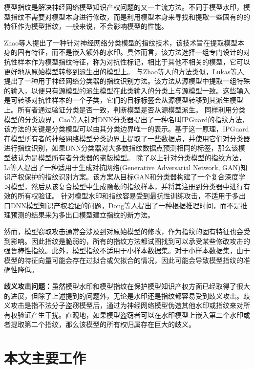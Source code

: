 模型指纹是解决神经网络模型知识产权问题的又一主流方法。不同于模型水印，模型指纹不需要对模型本身进行修改，而是利用模型本身来寻找和提取一些固有的的特征作为模型指纹，一般来说，不会影响模型的性能。

Zhao等人\cite{zhao2020afa}提出了一种针对神经网络分类模型的指纹技术，该技术旨在提取模型本身的固有特征，而不是嵌入额外的水印。具体而言，该方法选择一组专门设计的对抗性样本作为模型指纹特征，称为对抗性标记，相比于其他不相关的模型，它可以更好地从原始模型转移到派生出的模型上。
与Zhao等人\cite{zhao2020afa}的方法类似，Lukas等人\cite{lukas2019deep}提出了一种用于神经网络分类器的指纹识别方法。该方法从源模型中提取一组特殊的输入，以便只有源模型的派生模型在此类输入的分类上与源模型一致。这些输入是可转移对抗性样本的一个子类，它们的目标标签会从源模型转移到其派生模型上。所有者通过验证分类是否一致，判断模型是否从源模型派生。
同样利用分类模型的分类边界，Cao等人\cite{cao2021ipguard}针对DNN分类器提出了一种名叫IPGuard的指纹方法，该方法的关键是分类模型可以由其分类边界唯一的表示。基于这一原理，IPGuard在模型所有者的神经网络模型分类边界上提取了一些数据点，并使用它们对分类器进行指纹识别，如果DNN分类器对大多数指纹数据点预测相同的标签，那么该模型被认为是模型所有者分类器的盗版模型。
除了以上针对分类模型的指纹方法，Li等人\cite{li2021novel}提出了一种适用于生成对抗网络(Generative Adversarial Network, GAN)\cite{goodfellow2020generative}知识产权保护的指纹识别方案。该方案从目标GAN和分类器构建了一个复合深度学习模型，然后从该复合模型中生成隐蔽的指纹样本，并将其注册到分类器中进行有效的所有权验证。
针对模型水印和指纹容易受到最抗性训练攻击，不适用于多出口DNN模型知识产权验证的问题，Dong等人\cite{dong2021fingerprinting}提出了一种根据推理时间，而不是推理预测的结果来为多出口模型建立指纹的新方法。

然而，模型窃取攻击通常会涉及到对原始模型的修改，作为指纹的固有特征也会受到影响。因此指纹是脆弱的，所有的指纹方法都试图找到可以承受某些修改攻击的强鲁棒性指纹。此外，模型指纹不适用于小样本数据集。对于小样本数据集，由于模型的特征向量可能会存在过拟合或欠拟合的情况，因此可能会导致模型指纹的准确性降低。

\textbf{歧义攻击问题：}虽然模型水印和模型指纹在保护模型知识产权方面已经取得了很大的进展，但除了上述提到的问题外，无论是水印还是指纹都容易受到歧义攻击\cite{fan2019rethinking,li2019piracy}。歧义攻击是指不法分子盗窃模型后，通过为神经网络模型伪造其他水印或指纹来对所有权验证产生干扰。直观地，如果模型盗窃者可以在水印模型上嵌入第二个水印或者提取第二个指纹，那么该模型的所有权归属存在巨大的歧义。


\section{本文主要工作}

